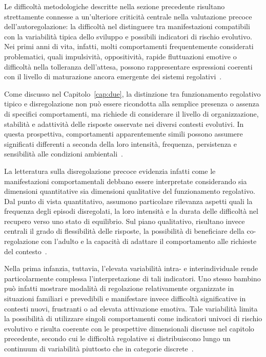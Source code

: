             Le difficoltà metodologiche descritte nella sezione precedente risultano strettamente connesse a un'ulteriore criticità centrale nella valutazione precoce dell'autoregolazione: la difficoltà nel distinguere tra manifestazioni compatibili con la variabilità tipica dello sviluppo e possibili indicatori di rischio evolutivo. Nei primi anni di vita, infatti, molti comportamenti frequentemente considerati problematici, quali impulsività, oppositività, rapide fluttuazioni emotive o difficoltà nella tolleranza dell'attesa, possono rappresentare espressioni coerenti con il livello di maturazione ancora emergente dei sistemi regolativi~\cite{calkins2007,eisenberg2010}.

            Come discusso nel Capitolo~\ref{cap:due}, la distinzione tra funzionamento regolativo tipico e disregolazione non può essere ricondotta alla semplice presenza o assenza di specifici comportamenti, ma richiede di considerare il livello di organizzazione, stabilità e adattività delle risposte osservate nei diversi contesti evolutivi. In questa prospettiva, comportamenti apparentemente simili possono assumere significati differenti a seconda della loro intensità, frequenza, persistenza e sensibilità alle condizioni ambientali~\cite{tronick2011}.

            La letteratura sulla disregolazione precoce evidenzia infatti come le manifestazioni comportamentali debbano essere interpretate considerando sia dimensioni quantitative sia dimensioni qualitative del funzionamento regolativo. Dal punto di vista quantitativo, assumono particolare rilevanza aspetti quali la frequenza degli episodi disregolati, la loro intensità e la durata delle difficoltà nel recupero verso uno stato di equilibrio. Sul piano qualitativo, risultano invece centrali il grado di flessibilità delle risposte, la possibilità di beneficiare della co-regolazione con l'adulto e la capacità di adattare il comportamento alle richieste del contesto~\cite{beauchaine2019,morris2007}.

            Nella prima infanzia, tuttavia, l'elevata variabilità intra- e interindividuale rende particolarmente complessa l'interpretazione di tali indicatori. Uno stesso bambino può infatti mostrare modalità di regolazione relativamente organizzate in situazioni familiari e prevedibili e manifestare invece difficoltà significative in contesti nuovi, frustranti o ad elevata attivazione emotiva. Tale variabilità limita la possibilità di utilizzare singoli comportamenti come indicatori univoci di rischio evolutivo e risulta coerente con le prospettive dimensionali discusse nel capitolo precedente, secondo cui le difficoltà regolative si distribuiscono lungo un continuum di variabilità piuttosto che in categorie discrete~\cite{astle2022,beauchaine2019}.

